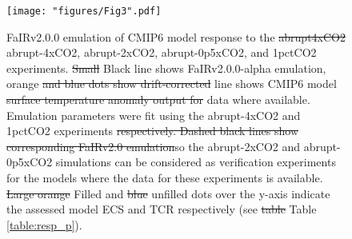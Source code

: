 \documentclass[gmd, manuscript]{copernicus}
\providecommand{\DIFadd}[1]{{\protect\color{blue}#1}} %
\providecommand{\DIFdel}[1]{{\protect\color{red}\sout{#1}}}                      %
\providecommand{\DIFaddend}{} %
\providecommand{\DIFaddFL}[1]{\DIFadd{#1}} %
\providecommand{\DIFdelFL}[1]{\DIFdel{#1}} %
\providecommand{\DIFaddbeginFL}{} %
\providecommand{\DIFaddendFL}{} %
\providecommand{\DIFdelbeginFL}{} %
\providecommand{\DIFdelendFL}{} %
\begin{document}
\DIFaddend \begin{figure}[t]
    \DIFdelbeginFL %
\DIFdelendFL \DIFaddbeginFL \texttt{[image: "figures/Fig3".pdf]}
    \DIFaddendFL \caption{FaIRv2.0\DIFaddbeginFL \DIFaddFL{.0 }\DIFaddendFL emulation of CMIP6 model response to the \DIFdelbeginFL \DIFdelFL{abrupt4xCO2 }\DIFdelendFL \DIFaddbeginFL \DIFaddFL{abrupt-4xCO2, abrupt-2xCO2, abrupt-0p5xCO2, }\DIFaddendFL and 1pctCO2 experiments. \DIFdelbeginFL \DIFdelFL{Small }\DIFdelendFL \DIFaddbeginFL \DIFaddFL{Black line shows FaIRv2.0.0-alpha emulation, }\DIFaddendFL orange \DIFdelbeginFL \DIFdelFL{and blue dots show drift-corrected }\DIFdelendFL \DIFaddbeginFL \DIFaddFL{line shows CMIP6 }\DIFaddendFL model \DIFdelbeginFL \DIFdelFL{surface temperature anomaly output for }\DIFdelendFL \DIFaddbeginFL \DIFaddFL{data where available. Emulation parameters were fit using }\DIFaddendFL the abrupt-4xCO2 and 1pctCO2 experiments \DIFdelbeginFL \DIFdelFL{respectively. Dashed black lines show corresponding FaIRv2.0 emulation}\DIFdelendFL \DIFaddbeginFL \DIFaddFL{so the abrupt-2xCO2 and abrupt-0p5xCO2 simulations can be considered as verification experiments for the models where the data for these experiments is available}\DIFaddendFL . \DIFdelbeginFL \DIFdelFL{Large orange }\DIFdelendFL \DIFaddbeginFL \DIFaddFL{Filled }\DIFaddendFL and \DIFdelbeginFL \DIFdelFL{blue }\DIFdelendFL \DIFaddbeginFL \DIFaddFL{unfilled }\DIFaddendFL dots over the y-axis indicate the assessed model ECS and TCR respectively (see \DIFdelbeginFL \DIFdelFL{table }\DIFdelendFL \DIFaddbeginFL \DIFaddFL{Table }\DIFaddendFL \ref{table:resp_p}).}
    \label{fig:resp_emulation}
\end{figure}
\clearpage
\end{document}
